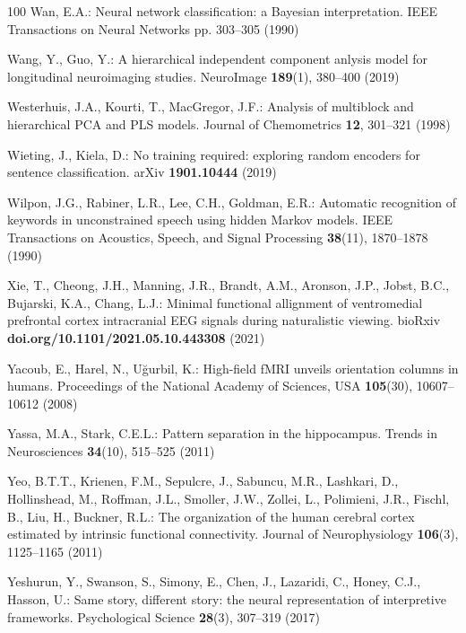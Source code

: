 \documentclass{llmxive}
\begin{document}
\begin{thebibliography}{100}
Wan, E.A.: Neural network classification: a {Bayesian} interpretation. {IEEE}
  Transactions on Neural Networks pp. 303--305 (1990)

Wang, Y., Guo, Y.: A hierarchical independent component anlysis model for
  longitudinal neuroimaging studies. {NeuroImage}  \textbf{189}(1),  380--400
  (2019)

Westerhuis, J.A., Kourti, T., MacGregor, J.F.: Analysis of multiblock and
  hierarchical {PCA} and {PLS} models. Journal of Chemometrics  \textbf{12},
  301--321 (1998)

Wieting, J., Kiela, D.: No training required: exploring random encoders for
  sentence classification. {arXiv}  \textbf{1901.10444} (2019)

Wilpon, J.G., Rabiner, L.R., Lee, C.H., Goldman, E.R.: Automatic recognition of
  keywords in unconstrained speech using hidden {M}arkov models. {IEEE}
  Transactions on Acoustics, Speech, and Signal Processing  \textbf{38}(11),
  1870--1878 (1990)

Xie, T., Cheong, J.H., Manning, J.R., Brandt, A.M., Aronson, J.P., Jobst, B.C.,
  Bujarski, K.A., Chang, L.J.: Minimal functional allignment of ventromedial
  prefrontal cortex intracranial {EEG} signals during naturalistic viewing.
  {bioRxiv}  \textbf{doi.org/10.1101/2021.05.10.443308} (2021)

Yacoub, E., Harel, N., U{\u{g}}urbil, K.: High-field {fMRI} unveils orientation
  columns in humans. Proceedings of the National Academy of Sciences, {USA}
  \textbf{105}(30),  10607--10612 (2008)

Yassa, M.A., Stark, C.E.L.: Pattern separation in the hippocampus. Trends in
  Neurosciences  \textbf{34}(10),  515--525 (2011)

Yeo, B.T.T., Krienen, F.M., Sepulcre, J., Sabuncu, M.R., Lashkari, D.,
  Hollinshead, M., Roffman, J.L., Smoller, J.W., Zollei, L., Polimieni, J.R.,
  Fischl, B., Liu, H., Buckner, R.L.: The organization of the human cerebral
  cortex estimated by intrinsic functional connectivity. Journal of
  Neurophysiology  \textbf{106}(3),  1125--1165 (2011)

Yeshurun, Y., Swanson, S., Simony, E., Chen, J., Lazaridi, C., Honey, C.J.,
  Hasson, U.: Same story, different story: the neural representation of
  interpretive frameworks. Psychological Science  \textbf{28}(3),  307--319
  (2017)


\end{thebibliography}
\end{document}
